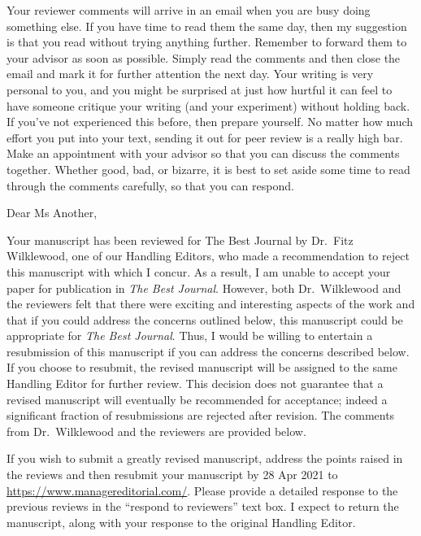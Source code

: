 \documentclass[
]{krantz}
\renewenvironment{quote}{\begin{VF}}{\end{VF}}
\begin{document}
Your reviewer comments will arrive in an email when you are busy doing something else. If you have time to read them the same day, then my suggestion is that you read without trying anything further. Remember to forward them to your advisor as soon as possible. Simply read the comments and then close the email and mark it for further attention the next day. Your writing is very personal to you, and you might be surprised at just how hurtful it can feel to have someone critique your writing (and your experiment) without holding back. If you've not experienced this before, then prepare yourself. No matter how much effort you put into your text, sending it out for peer review is a really high bar. Make an appointment with your advisor so that you can discuss the comments together. Whether good, bad, or bizarre, it is best to set aside some time to read through the comments carefully, so that you can respond.

\begin{quote}
Dear Ms Another,
\end{quote}

\begin{quote}
Your manuscript has been reviewed for The Best Journal by Dr.~Fitz Wilklewood, one of our Handling Editors, who made a recommendation to reject this manuscript with which I concur. As a result, I am unable to accept your paper for publication in \emph{The Best Journal}. However, both Dr.~Wilklewood and the reviewers felt that there were exciting and interesting aspects of the work and that if you could address the concerns outlined below, this manuscript could be appropriate for \emph{The Best Journal}. Thus, I would be willing to entertain a resubmission of this manuscript if you can address the concerns described below. If you choose to resubmit, the revised manuscript will be assigned to the same Handling Editor for further review. This decision does not guarantee that a revised manuscript will eventually be recommended for acceptance; indeed a significant fraction of resubmissions are rejected after revision. The comments from Dr.~Wilklewood and the reviewers are provided below.
\end{quote}

\begin{quote}
If you wish to submit a greatly revised manuscript, address the points raised in the reviews and then resubmit your manuscript by 28 Apr 2021 to \url{https://www.managereditorial.com/}. Please provide a detailed response to the previous reviews in the ``respond to reviewers'' text box. I expect to return the manuscript, along with your response to the original Handling Editor.
\end{quote}
\end{document}
